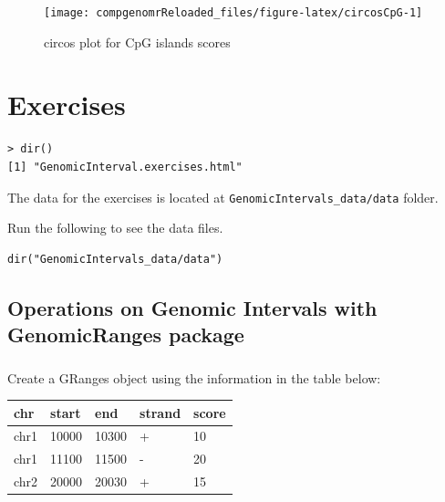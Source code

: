 \documentclass[12pt,]{krantz}
\begin{document}
\begin{figure}

{\centering \texttt{[image: compgenomrReloaded\_files/figure-latex/circosCpG-1]} 

}

\caption{circos plot for CpG islands scores}\label{fig:circosCpG}
\end{figure}

\hypertarget{exercises-4}{%
\section{Exercises}\label{exercises-4}}

\begin{verbatim}
> dir()
[1] "GenomicInterval.exercises.html"
\end{verbatim}

The data for the exercises is located at \texttt{GenomicIntervals\_data/data} folder.

Run the following to see the data files.

\begin{verbatim}
dir("GenomicIntervals_data/data")
\end{verbatim}

\hypertarget{operations-on-genomic-intervals-with-genomicranges-package-1}{%
\subsection{Operations on Genomic Intervals with GenomicRanges package}\label{operations-on-genomic-intervals-with-genomicranges-package-1}}

\hypertarget{section-9}{%
\subsubsection{}\label{section-9}}

Create a GRanges object using the information in the table below:

\begin{longtable}[]{@{}lllll@{}}
\toprule
chr & start & end & strand & score\tabularnewline
\midrule
\endhead
chr1 & 10000 & 10300 & + & 10\tabularnewline
chr1 & 11100 & 11500 & - & 20\tabularnewline
chr2 & 20000 & 20030 & + & 15\tabularnewline
\bottomrule
\end{longtable}

\hypertarget{section-10}{%
\subsubsection{}\label{section-10}}
\end{document}
